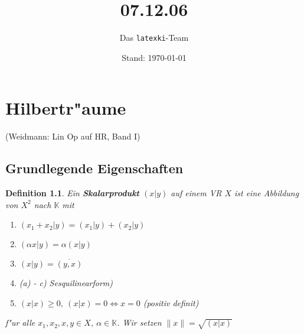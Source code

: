 \documentclass[a4paper,11pt]{book}
\title{07.12.06}
\author{Das \texttt{latexki}-Team\\[8 cm]}
\date{Stand: \today}
\newcommand{\K}{{\mathbb K}}
\newcommand{\begriff}[1]{\textbf{#1}} %
\newtheorem{Def}{Definition}[chapter]
\theoremstyle{nonumberplain}
\begin{document}
\chapter{Hilbertr"aume}

(Weidmann: Lin Op auf HR, Band I)

\section{Grundlegende Eigenschaften}

\begin{Def}
Ein \begriff{Skalarprodukt} $(x|y)$ auf einem VR $X$ ist eine Abbildung von $X^2$ nach $\K$ mit
\begin{enumerate}
\item $(x_1 + x_2 | y) = (x_1|y) + (x_2|y)$
\item $(\alpha x|y) = \alpha(x|y)$
\item $(x|y) = \overline{(y,x)}$
\item[] (a) - c) Sesquilinearform)
\item[d)] $(x|x) \geq 0,\ (x|x) = 0 \Leftrightarrow x = 0$ (positiv definit)
\end{enumerate}
f"ur alle $x_1,x_2,x,y \in X,\ \alpha \in \K$. Wir setzen $\|x\|=\sqrt{(x|x)}$
\end{Def}
\end{document}
